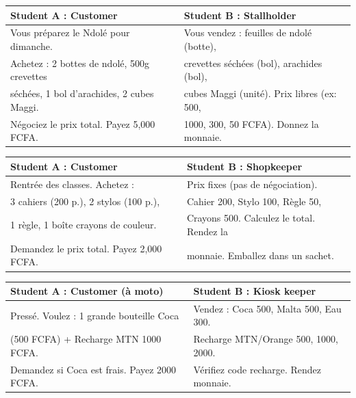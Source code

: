 \documentclass[11pt]{article}
\begin{document}
\begin{experience}
\begin{tabularx}{\linewidth}{|X|X|}
\hline
\rowcolor{poporangeL} \textbf{Student A : Customer} & \textbf{Student B : Stallholder} \\
\hline
Vous préparez le Ndolé pour dimanche. & Vous vendez : feuilles de ndolé (botte), \\
Achetez : 2 bottes de ndolé, 500g crevettes & crevettes séchées (bol), arachides (bol), \\
séchées, 1 bol d'arachides, 2 cubes Maggi. & cubes Maggi (unité). Prix libres (ex: 500, \\
Négociez le prix total. Payez 5,000 FCFA. & 1000, 300, 50 FCFA). Donnez la monnaie. \\
\hline
\end{tabularx}
\end{experience}

\begin{experience}
\begin{tabularx}{\linewidth}{|X|X|}
\hline
\rowcolor{popgreenL} \textbf{Student A : Customer} & \textbf{Student B : Shopkeeper} \\
\hline
Rentrée des classes. Achetez : & Prix fixes (pas de négociation). \\
3 cahiers (200 p.), 2 stylos (100 p.), & Cahier 200, Stylo 100, Règle 50, \\
1 règle, 1 boîte crayons de couleur. & Crayons 500. Calculez le total. Rendez la \\
Demandez le prix total. Payez 2,000 FCFA. & monnaie. Emballez dans un sachet. \\
\hline
\end{tabularx}
\end{experience}

\begin{experience}
\begin{tabularx}{\linewidth}{|X|X|}
\hline
\rowcolor{popblueL} \textbf{Student A : Customer (à moto)} & \textbf{Student B : Kiosk keeper} \\
\hline
Pressé. Voulez : 1 grande bouteille Coca & Vendez : Coca 500, Malta 500, Eau 300. \\
(500 FCFA) + Recharge MTN 1000 FCFA. & Recharge MTN/Orange 500, 1000, 2000. \\
Demandez si Coca est frais. Payez 2000 FCFA. & Vérifiez code recharge. Rendez monnaie. \\
\hline
\end{tabularx}
\end{experience}
\end{document}
